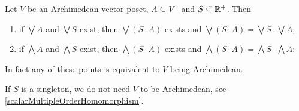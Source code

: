 \begin{lemma} \label{extremaScalarProduct}
Let $V$ be an Archimedean vector poset, $A\subseteq V^+$ and $S\subseteq \mathbb{R}^+$. Then
\begin{enumerate}
\item if $\bigvee A$ and $\bigvee S$ exist, then $\bigvee(S\cdot A)$ exists and $\bigvee(S\cdot A) = \bigvee S\cdot \bigvee A$;
\item if $\bigwedge A$ and $\bigwedge S$ exist, then $\bigwedge(S\cdot A)$ exists and $\bigwedge(S\cdot A) = \bigwedge S\cdot \bigwedge A$;
\end{enumerate}
\end{lemma}
In fact any of these points is equivalent to $V$ being Archimedean.

If $S$ is a singleton, we do not need $V$ to be Archimedean, see \ref{scalarMultipleOrderHomomorphism}.
